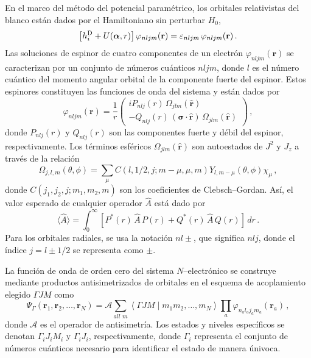 En el marco del método del potencial paramétrico, los orbitales 
relativistas del blanco están dados por el Hamiltoniano sin perturbar 
$H_0$, 
\begin{equation}
\left[ h_i^{\mbox{\scriptsize D}} +U(\boldsymbol{\alpha},r) \right] 
\varphi_{nljm}(\mathbf{r}) 
= \varepsilon_{nljm} \, \varphi_{nljm}(\mathbf{r})\,.
\label{eq:ecuacionDirac}
\end{equation}
Las soluciones de espinor de cuatro componentes de un electrón 
$\varphi_{nljm}(\mathbf{r})$ se caracterizan por un conjunto de 
números cuánticos $nljm$, donde $l$ es el número cuántico del momento 
angular orbital de la componente fuerte del espinor. 
%
Estos espinores constituyen las funciones de onda del sistema y están 
dados por 
\begin{equation}
\varphi_{nljm}(\mathbf{r}) = \frac{1}{r} \left( 
\begin{array}{c}
i P_{nlj}(r) \,\Omega_{jlm}(\hat{\mathbf{r}}) \\ 
- Q_{nlj}(r) \,(\boldsymbol{\sigma}\cdot\hat{\mathbf{r}})\,
\Omega_{jlm}(\hat{\mathbf{r}})
\end{array}
\right)\,,
\label{eq:sepespinor}
\end{equation}
donde $P_{nlj}(r)$ y $Q_{nlj}(r)$ son las componentes fuerte y débil del
espinor, respectivamente. Los términos esféricos 
$\Omega_{jlm}(\hat{\mathbf{r}})$ son autoestados de $J^2$ y $J_z$ a 
través de la relación
\begin{equation}
\Omega_{j,l,m}(\theta,\phi)=\sum_{\mu} C(l,1/2,j;m-\mu,\mu,m) 
Y_{l,m-\mu}(\theta,\phi)\chi_{\mu}\,,
\end{equation}
donde $C\left(j_1,j_2,j;m_1,m_2,m\right)$ son los coeficientes de 
Clebsch--Gordan. Así, el valor esperado de cualquier operador $\hat{A}$ 
está dado por
\begin{equation}
\langle\hat{A}\rangle=\int_0^{\infty}\left[P^*(r)\,\hat{A}\,P(r) 
 +Q^*(r)\,\hat{A}\,Q(r)
\right]\,dr\,.
\label{eq:meanvalr}
\end{equation}
Para los orbitales radiales, se usa la notación $nl\pm$, que significa 
$nlj$, donde el índice $j=l\pm1/2$ se representa como $\pm$.

La función de onda de orden cero del sistema $N$--electrónico se 
construye mediante productos antisimetrizados de orbitales en el 
esquema de acoplamiento elegido $\Gamma JM$ como 
\begin{equation}
\Psi_{\Gamma}\left(\mathbf{r}_1,\mathbf{r}_2,\ldots,\mathbf{r}_N\right)
=\mathcal{A}\sum_{all\,\,m}\left\langle\Gamma JM\mid m_1 m_2,\ldots,m_{N}\right
\rangle \prod_{a} \varphi_{n_a l_a j_a m_a}\left(\mathbf{r}_a\right)\,,
\end{equation}
donde $\mathcal{A}$ es el operador de antisimetría. Los estados y niveles 
específicos se denotan $\Gamma_iJ_iM_i$ y $\Gamma_iJ_i$, respectivamente,
donde $\Gamma_i$ representa el conjunto de números cuánticos necesario 
para identificar el estado de manera únivoca. 

